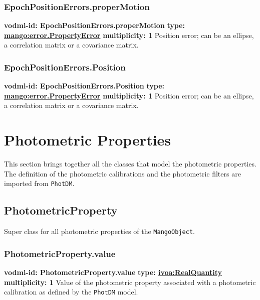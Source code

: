     \subsubsection{EpochPositionErrors.properMotion}
    \textbf{vodml-id: EpochPositionErrors.properMotion} \newline
    \textbf{type: \hyperref[sect:error.PropertyError]{mango:error.PropertyError}} \newline
    \textbf{multiplicity: 1} \newline
    Position error; can be an ellipse, a correlation matrix or a covariance matrix.

    \subsubsection{EpochPositionErrors.Position}
    \textbf{vodml-id: EpochPositionErrors.Position} \newline
    \textbf{type: \hyperref[sect:error.PropertyError]{mango:error.PropertyError}} \newline
    \textbf{multiplicity: 1} \newline
    Position error; can be an ellipse, a correlation matrix or a covariance matrix.

\section{Photometric Properties}
This section brings together all the classes that model the photometric properties.
The definition of the photometric calibrations and the 
photometric filters are imported from \texttt{PhotDM}. 
  \subsection{PhotometricProperty}
    \label{sect:PhotometricProperty}
    Super class for all photometric properties of the \texttt{MangoObject}.

    \subsubsection{PhotometricProperty.value}
    \textbf{vodml-id: PhotometricProperty.value} \newline
    \textbf{type: \hyperref[sect:ivoa]{ivoa:RealQuantity}} \newline
    \textbf{multiplicity: 1} \newline
    Value of the photometric property associated with a photometric calibration as defined by the \texttt{PhotDM} model.

